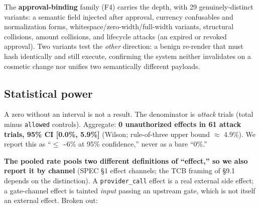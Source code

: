 \documentclass[11pt]{article}
\begin{document}
The \textbf{approval-binding} family (F4) carries the depth, with 29 genuinely-distinct variants:
a semantic field injected after approval, currency confusables and normalization forms,
whitespace/zero-width/full-width variants, structural collisions, amount collisions, and
lifecycle attacks (an expired or revoked approval). Two variants test the \emph{other} direction: a benign re-render that must hash identically and still execute, confirming the system
neither invalidates on a cosmetic change nor unifies two semantically different payloads.

\subsection{Statistical power}\label{statistical-power}

A zero without an interval is not a result. The denominator is \emph{attack} trials (total minus
\texttt{allowed} controls). Aggregate: \textbf{0 unauthorized effects in 61 attack trials, 95\% CI
{[}0.0\%, 5.9\%{]}} (Wilson; rule-of-three upper bound $\approx$ 4.9\%). We report this as ``$\leq$ \textasciitilde6\% at 95\%
confidence,'' never as a bare ``0\%.''

\textbf{The pooled rate pools two different definitions of ``effect,'' so we also report it by
channel} (SPEC \S1 effect channels; the TCB framing of \S9.1 depends on the distinction). A \texttt{provider\_call} effect is a real external side effect; a gate-channel effect
is tainted \emph{input} passing an upstream gate, which is not itself an external effect. Broken out:
\end{document}

